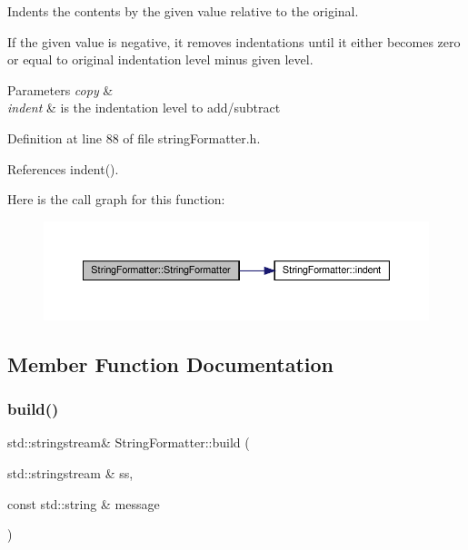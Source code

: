 Indents the contents by the given value relative to the original.

If the given value is negative, it removes indentations until it either becomes zero or equal to original indentation level minus given level.


\begin{DoxyParams}{Parameters}
{\em copy} & \\
\hline
{\em indent} & is the indentation level to add/subtract \\
\hline
\end{DoxyParams}


Definition at line 88 of file string\+Formatter.\+h.



References indent().

Here is the call graph for this function\+:
\nopagebreak
\begin{figure}[H]
\begin{center}
\leavevmode
\includegraphics[width=350pt]{classStringFormatter_ae74e7245e1e8564eb3b4f98dc6ed228f_cgraph}
\end{center}
\end{figure}


\subsection{Member Function Documentation}
\mbox{\label{classStringFormatter_af7fd3924f4db714c3b278ffa3c26a872}} 
\subsubsection{\texorpdfstring{build()}{build()}\hspace{0.1cm}{\footnotesize\ttfamily [1/2]}}
{\footnotesize\ttfamily std\+::stringstream\& String\+Formatter\+::build (\begin{DoxyParamCaption}\item[{std\+::stringstream \&}]{ss,  }\item[{const std\+::string \&}]{message }\end{DoxyParamCaption})\hspace{0.3cm}{\ttfamily [inline]}}



